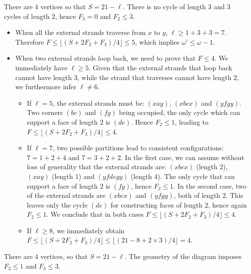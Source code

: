 \documentclass[10pt]{article}
\theoremstyle{plain}
\theoremstyle{definition}
\begin{document}
 There are $4$ vertices so that $S= 21 - \ell$. There is no cycle of length $3$ and $3$ cycles of length $2$, hence $F_3 = 0$ and $F_2 \leq 3$.
\begin{itemize}

\item When all the external strands traverse from $x$ to $y$, $\ell \geq 1+3+3=7$. Therefore
$F \leq \lfloor ( S + 2 F_2 + F_3) /4 \rfloor \leq 5$, which implies $\omega' \leq \omega - 1$.

\item When two external strands loop back, we need to prove that $F \leq 4$. We immediately have $\ell \geq 5$. Given that the external strands that loop back cannot have length $3$, while the strand that traverses cannot 
have length $2$, we furthermore infer $\ell \neq 6$.

\begin{itemize}

\item If $\ell=5$, the external strands must be: $(xay)$, $(xbcx)$ and $(yfgy)$. Two corners $(bc)$ and $(fg)$ being occupied, the only cycle which can support a face of length $2$ is $(de)$. Hence $F_2 \leq 1$, leading to
$F \leq \lfloor ( S + 2 F_2 + F_3) /4 \rfloor \leq 4$. 


\item If $\ell=7$, two possible partitions lead to consistent configurations: $7 = 1 + 2 + 4$ and $7 = 3 + 2 + 2$. In the first case, we can assume without loss of generality that the external strands are: $(xbcx)$ (length $2$), $(xay)$ (length $1$) and $(yfdegy)$ (length $4$). The only cycle that can support a face of length $2$ is $(fg)$, hence $F_2 \leq 1$. 
In the second case, two of the external strands are $(xbcx)$ and $(yfgy)$, both of length $2$. This leaves only the cycle $(de)$ for constructing faces of length $2$, hence again $F_2 \leq 1$. We conclude that in both cases $F \leq \lfloor ( S + 2 F_2 + F_3) /4 \rfloor \leq 4$. 


\item If $\ell \geq 8$, we immediately obtain $F \leq \lfloor ( S + 2 F_2 + F_3) /4 \rfloor \leq \lfloor (21-8 + 2\times 3) / 4 \rfloor = 4$.

\end{itemize}


\end{itemize}

 There are $4$ vertices, so that $S = 21 - \ell$. The geometry of the diagram imposes $F_2 \leq 1$ and $F_3 \leq 3$.
\end{document}

